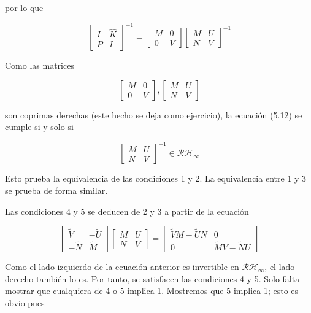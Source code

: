 por lo que

$$
\left[\begin{array}{cc}
I & \hat{K} \\
P & I
\end{array}\right]^{-1}=\left[\begin{array}{cc}
M & 0 \\
0 & V
\end{array}\right]\left[\begin{array}{ll}
M & U \\
N & V
\end{array}\right]^{-1}
$$

Como las matrices

$$
\left[\begin{array}{cc}
M & 0 \\
0 & V
\end{array}\right],\left[\begin{array}{cc}
M & U \\
N & V
\end{array}\right]
$$

son coprimas derechas (este hecho se deja como ejercicio), la ecuación (5.12) se cumple si y solo si

$$
\left[\begin{array}{ll}
M & U \\
N & V
\end{array}\right]^{-1} \in \mathcal{R} \mathcal{H}_{\infty}
$$

Esto prueba la equivalencia de las condiciones 1 y 2. La equivalencia entre 1 y 3 se prueba de forma similar.

Las condiciones 4 y 5 se deducen de 2 y 3 a partir de la ecuación

$$
\left[\begin{array}{cc}
\tilde{V} & -\tilde{U} \\
-\tilde{N} & \tilde{M}
\end{array}\right]\left[\begin{array}{cc}
M & U \\
N & V
\end{array}\right]=\left[\begin{array}{cc}
\tilde{V} M-\tilde{U} N & 0 \\
0 & \tilde{M} V-\tilde{N} U
\end{array}\right]
$$

Como el lado izquierdo de la ecuación anterior es invertible en $\mathcal{R} \mathcal{H}_{\infty}$, el lado derecho también lo es. Por tanto, se satisfacen las condiciones 4 y 5. Solo falta mostrar que cualquiera de 4 o 5 implica 1. Mostremos que 5 implica 1; esto es obvio pues

